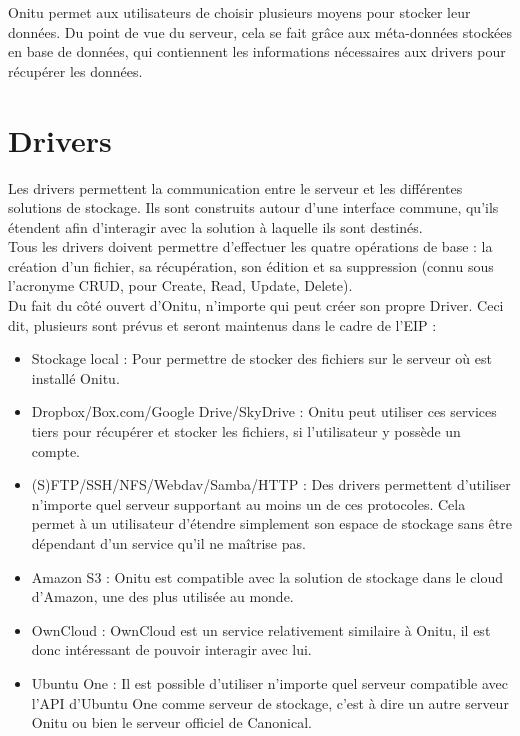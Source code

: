 Onitu permet aux utilisateurs de choisir plusieurs moyens pour stocker leur données. Du point de vue du serveur, cela se fait grâce aux méta-données stockées en base de données, qui contiennent les informations nécessaires aux drivers pour récupérer les données.\\

\section{Drivers}
Les drivers permettent la communication entre le serveur et les différentes solutions de stockage. Ils sont construits autour d'une interface commune, qu'ils étendent afin d'interagir avec la solution à laquelle ils sont destinés.\\

Tous les drivers doivent permettre d'effectuer les quatre opérations de base : la création d'un fichier, sa récupération, son édition et sa suppression (connu sous l'acronyme CRUD, pour Create, Read, Update, Delete).\\

Du fait du côté ouvert d'Onitu, n'importe qui peut créer son propre Driver. Ceci dit, plusieurs sont prévus et seront maintenus dans le cadre de l'EIP :
\begin{itemize}
    \item Stockage local : Pour permettre de stocker des fichiers sur le serveur où est installé Onitu.
    \item Dropbox/Box.com/Google Drive/SkyDrive : Onitu peut utiliser ces services tiers pour récupérer et stocker les fichiers, si l'utilisateur y possède un compte.
    \item (S)FTP/SSH/NFS/Webdav/Samba/HTTP : Des drivers permettent d'utiliser n'importe quel serveur supportant au moins un de ces protocoles. Cela permet à un utilisateur d'étendre simplement son espace de stockage sans être dépendant d'un service qu'il ne maîtrise pas.
    \item Amazon S3 : Onitu est compatible avec la solution de stockage dans le cloud d'Amazon, une des plus utilisée au monde.
    \item OwnCloud : OwnCloud est un service relativement similaire à Onitu, il est donc intéressant de pouvoir interagir avec lui.
    \item Ubuntu One : Il est possible d'utiliser n'importe quel serveur compatible avec l'API d'Ubuntu One comme serveur de stockage, c'est à dire un autre serveur Onitu ou bien le serveur officiel de Canonical.
\end{itemize}


